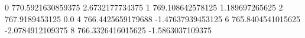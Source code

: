 0 770.5921630859375 2.6732177734375
1 769.108642578125 1.189697265625
2 767.9189453125 0.0
4 766.4425659179688 -1.47637939453125
6 765.8404541015625 -2.0784912109375
8 766.3326416015625 -1.5863037109375
